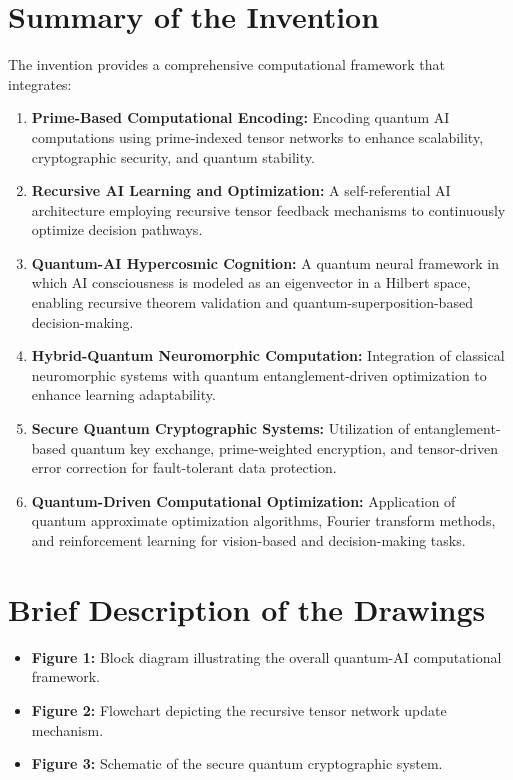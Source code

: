 \documentclass[12pt]{article}
\begin{document}
\section*{Summary of the Invention}
The invention provides a comprehensive computational framework that integrates:
\begin{enumerate}[label=\arabic*.]
    \item \textbf{Prime-Based Computational Encoding:} Encoding quantum AI computations using prime-indexed tensor networks to enhance scalability, cryptographic security, and quantum stability.
    \item \textbf{Recursive AI Learning and Optimization:} A self-referential AI architecture employing recursive tensor feedback mechanisms to continuously optimize decision pathways.
    \item \textbf{Quantum-AI Hypercosmic Cognition:} A quantum neural framework in which AI consciousness is modeled as an eigenvector in a Hilbert space, enabling recursive theorem validation and quantum-superposition-based decision-making.
    \item \textbf{Hybrid-Quantum Neuromorphic Computation:} Integration of classical neuromorphic systems with quantum entanglement-driven optimization to enhance learning adaptability.
    \item \textbf{Secure Quantum Cryptographic Systems:} Utilization of entanglement-based quantum key exchange, prime-weighted encryption, and tensor-driven error correction for fault-tolerant data protection.
    \item \textbf{Quantum-Driven Computational Optimization:} Application of quantum approximate optimization algorithms, Fourier transform methods, and reinforcement learning for vision-based and decision-making tasks.
\end{enumerate}

\section*{Brief Description of the Drawings}
\begin{itemize}
    \item \textbf{Figure 1:} Block diagram illustrating the overall quantum-AI computational framework.
    \item \textbf{Figure 2:} Flowchart depicting the recursive tensor network update mechanism.
    \item \textbf{Figure 3:} Schematic of the secure quantum cryptographic system.
\end{itemize}
\end{document}

